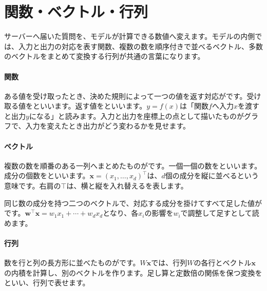 \section{関数・ベクトル・行列}
\label{sec:06-machine-learning-01}

サーバーへ届いた質問を、モデルが計算できる数値へ変えます。モデルの内側では、入力と出力の対応を表す関数、複数の数を順序付きで並べるベクトル、多数のベクトルをまとめて変換する行列が共通の言葉になります。

\begingroup
\begingroup
\begin{samepage}
\paragraph{関数}
        ある値を受け取ったとき、決めた規則によって一つの値を返す対応がです。受け取る値をといいます。返す値をといいます。$y=f(x)$は「関数$f$へ入力$x$を渡すと出力$y$になる」と読みます。入力と出力を座標上の点として描いたものがグラフで、入力を変えたとき出力がどう変わるかを見せます。

      \par\smallskip
      \begin{center}
      \end{center}
\end{samepage}
\par
\endgroup
\medskip
\begingroup
\paragraph{ベクトル}
        複数の数を順番のある一列へまとめたものがです。一個一個の数をといいます。成分の個数をといいます。$\mathbf{x}=(x_1,\ldots,x_d)^\top$は、$d$個の成分を縦に並べるという意味です。右肩の$\top$は、横と縦を入れ替えるを表します。

        同じ数の成分を持つ二つのベクトルで、対応する成分を掛けてすべて足した値がです。$\mathbf{w}^\top\mathbf{x}=w_1x_1+\cdots+w_dx_d$となり、各$x_i$の影響を$w_i$で調整して足すとして読めます。

\paragraph{行列}
        数を行と列の長方形に並べたものがです。$W\mathbf{x}$では、行列$W$の各行とベクトル$\mathbf{x}$の内積を計算し、別のベクトルを作ります。足し算と定数倍の関係を保つ変換をといい、行列で表せます。

